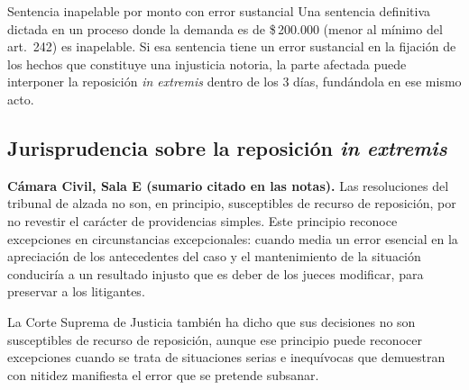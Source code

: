 \documentclass[12pt,oneside]{book}
\begin{document}
\begin{example}{Sentencia inapelable por monto con error sustancial}
Una sentencia definitiva dictada en un proceso donde la demanda es de \$\,200.000 (menor al m\'inimo del art.~242) es inapelable. Si esa sentencia tiene un error sustancial en la fijaci\'on de los hechos que constituye una injusticia notoria, la parte afectada puede interponer la reposici\'on \textit{in extremis} dentro de los 3 d\'ias, fund\'andola en ese mismo acto.
\end{example}

\subsection{Jurisprudencia sobre la reposici\'on \textit{in extremis}}

\begin{note}
\textbf{C\'amara Civil, Sala E (sumario citado en las notas).} Las resoluciones del tribunal de alzada no son, en principio, susceptibles de recurso de reposici\'on, por no revestir el car\'acter de providencias simples. Este principio reconoce excepciones en circunstancias excepcionales: cuando media un error esencial en la apreciaci\'on de los antecedentes del caso y el mantenimiento de la situaci\'on conducir\'ia a un resultado injusto que es deber de los jueces modificar, para preservar a los litigantes.
\end{note}

La Corte Suprema de Justicia tambi\'en ha dicho que sus decisiones no son susceptibles de recurso de reposici\'on, aunque ese principio puede reconocer excepciones cuando se trata de situaciones serias e inequ\'ivocas que demuestran con nitidez manifiesta el error que se pretende subsanar.
\end{document}

